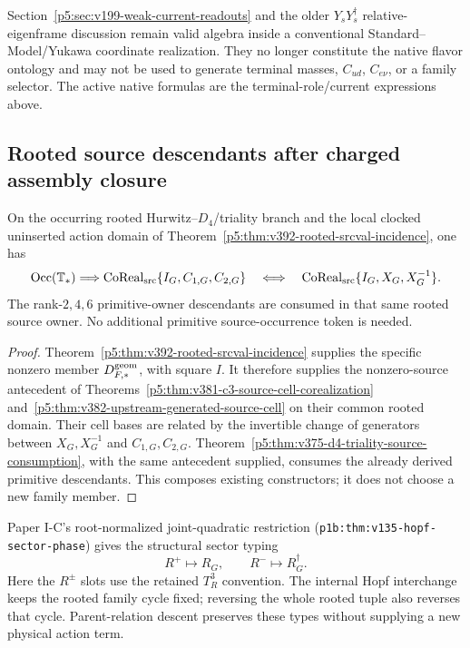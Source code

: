 \documentclass[12pt,a4paper]{article}
\begin{document}
\begin{remark}
\label{p5:rem:v3101-supersede-yukawa-gram-flavor}
Section~\ref{p5:sec:v199-weak-current-readouts} and the older
$Y_sY_s^\dagger$ relative-eigenframe discussion remain valid algebra inside a
conventional Standard--Model/Yukawa coordinate realization.  They no longer
constitute the native flavor ontology and may not be used to generate terminal
masses, $C_{ud}$, $C_{e\nu}$, or a family selector.  The active native formulas
are the terminal-role/current expressions above.
\end{remark}

\subsection{Rooted source descendants after charged assembly closure}
\label{p5:sec:v393-rooted-assembly-target}
\begin{corollary}
\label{p5:cor:v393-rooted-source-descendants}
On the occurring rooted Hurwitz--$D_4$/triality branch and the local
clocked uninserted action domain of
Theorem~\ref{p5:thm:v392-rooted-srcval-incidence}, one has
\[
 \operatorname{Occ}(\mathbb T_*)
 \Longrightarrow
 \operatorname{CoReal}_{\rm src}\{I_G,C_{1,G},C_{2,G}\}
 \quad\Longleftrightarrow\quad
 \operatorname{CoReal}_{\rm src}\{I_G,X_G,X_G^{-1}\}.
\]
The rank-$2,4,6$ primitive-owner descendants are consumed in that same
rooted source owner. No additional primitive source-occurrence token is needed.
\end{corollary}
\begin{proof}
Theorem~\ref{p5:thm:v392-rooted-srcval-incidence} supplies the specific
nonzero member $D_{F,*}^{\rm geom}$, with square $I$.
It therefore supplies the nonzero-source antecedent of
Theorems~\ref{p5:thm:v381-c3-source-cell-corealization}
and~\ref{p5:thm:v382-upstream-generated-source-cell} on their common rooted
domain. Their cell bases are related by the invertible change of generators
between $X_G,X_G^{-1}$ and $C_{1,G},C_{2,G}$.
Theorem~\ref{p5:thm:v375-d4-triality-source-consumption}, with the same
antecedent supplied, consumes the already derived primitive descendants.
This composes existing constructors; it does not choose a new family member.
\end{proof}

Paper I-C's root-normalized joint-quadratic restriction
(\texttt{p1b:thm:v135-\allowbreak hopf-\allowbreak sector-\allowbreak phase}) gives the structural sector typing
\[
 R^+\longmapsto R_G,\qquad R^-\longmapsto R_G^\dagger.
\]
Here the $R^\pm$ slots use the retained $T_R^3$ convention. The internal
Hopf interchange keeps the rooted family cycle fixed; reversing the whole
rooted tuple also reverses that cycle. Parent-relation descent preserves
these types without supplying a new physical action term.
\end{document}
